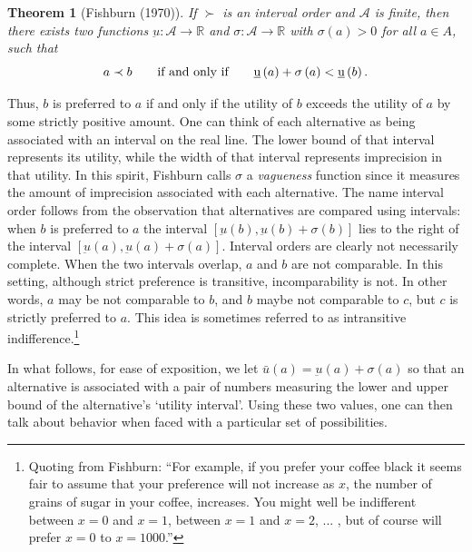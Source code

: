 \documentclass[reqno]{article}
\newtheorem{theorem}{Theorem}
\begin{document}
\begin{theorem}[Fishburn (1970)] \label{Fishburn1970}
If $\succ $ is an interval order and $\mathcal{A}$ is finite, then there
exists two functions $\underbar{u}:\mathcal{A}\rightarrow \mathbb{R}$ and $\sigma :%
\mathcal{A}\rightarrow \mathbb{R}$ with $\sigma (a)>0$ for all $a\in A$,
such that%
\begin{equation*}
a\prec b\text{\qquad if and only if\qquad } \underbar{u} \left( a\right) +\sigma \left(
a\right) <\underbar{u}\left( b\right).
\end{equation*}
\end{theorem}

Thus, $b$ is preferred to $a$ if and only if the utility of $b$ exceeds the
utility of $a$ by some strictly positive amount. One can think of each
alternative as being associated with an interval on the real line. The lower
bound of that interval represents its utility, while the width of that
interval represents imprecision in that utility. In this spirit, Fishburn
calls $\sigma $ a \emph{vagueness} function since it measures the amount of
imprecision associated with each alternative. The name interval order
follows from the observation that alternatives are compared using intervals:
when $b$ is preferred to $a$ the interval $\left[ \underbar{u} \left( b\right) ,\underbar{u} \left( b\right) +\sigma \left( b\right) \right] $ lies to the right of the interval 
$\left[ \underbar{u} \left( a\right) ,\underbar{u} \left( a\right) +\sigma \left( a\right) \right] $. Interval orders are clearly not necessarily complete. When the two
intervals overlap, $a$ and $b$ are not comparable. In this setting, although
strict preference is transitive, incomparability is not. In other words, $a$
may be not comparable to $b$, and $b$ maybe not comparable to $c$, but $c$
is strictly preferred to $a$. This idea is sometimes referred to as
intransitive indifference.\footnote{Quoting from Fishburn: \textquotedblleft For example, if you prefer your coffee black it seems fair to assume that your preference will not increase as $x$, the number of grains of sugar in your coffee, increases. You might well be indifferent between $x=0$ and $x=1$, between $x=1$ and $x=2$, ... ,
but of course will prefer $x=0$ to $x=1000$.\textquotedblright}

In what follows, for ease of exposition, we let $\bar{u} (a)= \underbar{u} \left( a\right)
+\sigma \left( a\right) $ so that an alternative is associated with a pair
of numbers measuring the lower and upper bound of the alternative's `utility
interval'. Using these two values, one can then talk about behavior when
faced with a particular set of possibilities.
\end{document}
